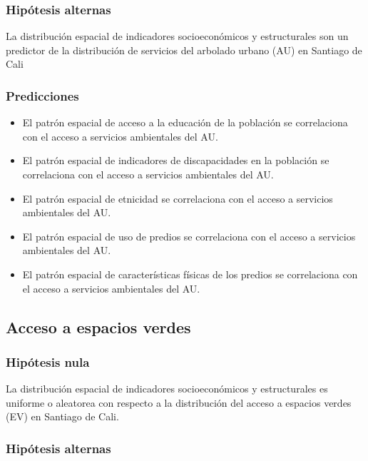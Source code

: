 \documentclass[12pt,]{book}
\providecommand{\tightlist}{%
  \setlength{\itemsep}{0pt}\setlength{\parskip}{0pt}}
\begin{document}
\subsubsection{Hipótesis alternas}\label{hipotesis-alternas}

La distribución espacial de indicadores socioeconómicos y estructurales
son un predictor de la distribución de servicios del arbolado urbano
(AU) en Santiago de Cali

\subsubsection{Predicciones}\label{predicciones}

\begin{itemize}
\tightlist
\item
  El patrón espacial de acceso a la educación de la población se
  correlaciona con el acceso a servicios ambientales del AU.
\item
  El patrón espacial de indicadores de discapacidades en la población se
  correlaciona con el acceso a servicios ambientales del AU.
\item
  El patrón espacial de etnicidad se correlaciona con el acceso a
  servicios ambientales del AU.
\item
  El patrón espacial de uso de predios se correlaciona con el acceso a
  servicios ambientales del AU.
\item
  El patrón espacial de características físicas de los predios se
  correlaciona con el acceso a servicios ambientales del AU.
\end{itemize}

\subsection{Acceso a espacios verdes}\label{acceso-a-espacios-verdes}

\subsubsection{Hipótesis nula}\label{hipotesis-nula-1}

La distribución espacial de indicadores socioeconómicos y estructurales
es uniforme o aleatorea con respecto a la distribución del acceso a
espacios verdes (EV) en Santiago de Cali.

\subsubsection{Hipótesis alternas}\label{hipotesis-alternas-1}
\end{document}
